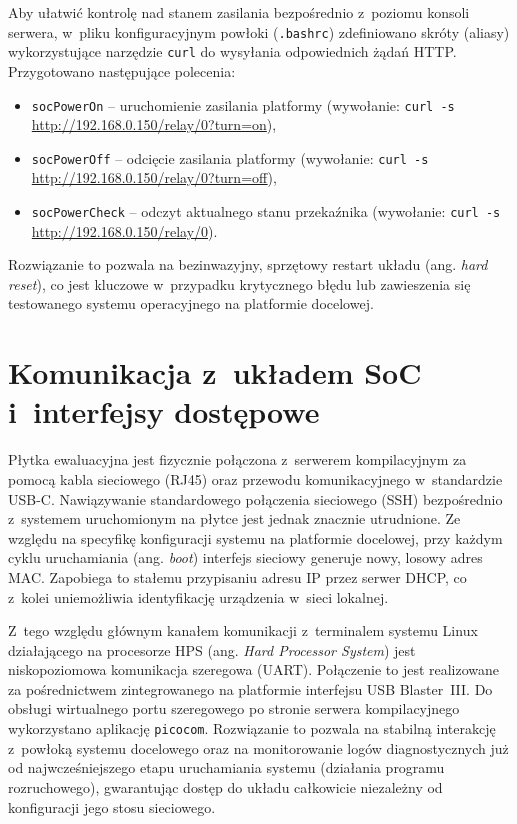 Aby ułatwić kontrolę nad stanem zasilania bezpośrednio z~poziomu konsoli serwera, w~pliku konfiguracyjnym powłoki (\texttt{.bashrc}) zdefiniowano skróty (aliasy) wykorzystujące narzędzie \texttt{curl} do wysyłania odpowiednich żądań HTTP. Przygotowano następujące polecenia:
\begin{itemize}
    \item \texttt{socPowerOn} -- uruchomienie zasilania platformy (wywołanie: \texttt{curl -s} \url{http://192.168.0.150/relay/0?turn=on}),
    \item \texttt{socPowerOff} -- odcięcie zasilania platformy (wywołanie: \texttt{curl -s} \url{http://192.168.0.150/relay/0?turn=off}),
    \item \texttt{socPowerCheck} -- odczyt aktualnego stanu przekaźnika (wywołanie: \texttt{curl -s} \url{http://192.168.0.150/relay/0}).
\end{itemize}
Rozwiązanie to pozwala na bezinwazyjny, sprzętowy restart układu (ang. \textit{hard reset}), co jest kluczowe w~przypadku krytycznego błędu lub zawieszenia się testowanego systemu operacyjnego na platformie docelowej.

\section{Komunikacja z~układem SoC i~interfejsy dostępowe}
Płytka ewaluacyjna jest fizycznie połączona z~serwerem kompilacyjnym za pomocą kabla sieciowego (RJ45) oraz przewodu komunikacyjnego w~standardzie USB-C. Nawiązywanie standardowego połączenia sieciowego (SSH) bezpośrednio z~systemem uruchomionym na płytce jest jednak znacznie utrudnione. Ze względu na specyfikę konfiguracji systemu na platformie docelowej, przy każdym cyklu uruchamiania (ang. \textit{boot}) interfejs sieciowy generuje nowy, losowy adres MAC. Zapobiega to stałemu przypisaniu adresu IP przez serwer DHCP, co z~kolei uniemożliwia identyfikację urządzenia w~sieci lokalnej.

Z~tego względu głównym kanałem komunikacji z~terminalem systemu Linux działającego na procesorze HPS (ang. \textit{Hard Processor System}) jest niskopoziomowa komunikacja szeregowa (UART). Połączenie to jest realizowane za pośrednictwem zintegrowanego na platformie interfejsu USB Blaster~III. Do obsługi wirtualnego portu szeregowego po stronie serwera kompilacyjnego wykorzystano aplikację \texttt{picocom}. Rozwiązanie to pozwala na stabilną interakcję z~powłoką systemu docelowego oraz na monitorowanie logów diagnostycznych już od najwcześniejszego etapu uruchamiania systemu (działania programu rozruchowego), gwarantując dostęp do układu całkowicie niezależny od konfiguracji jego stosu sieciowego.